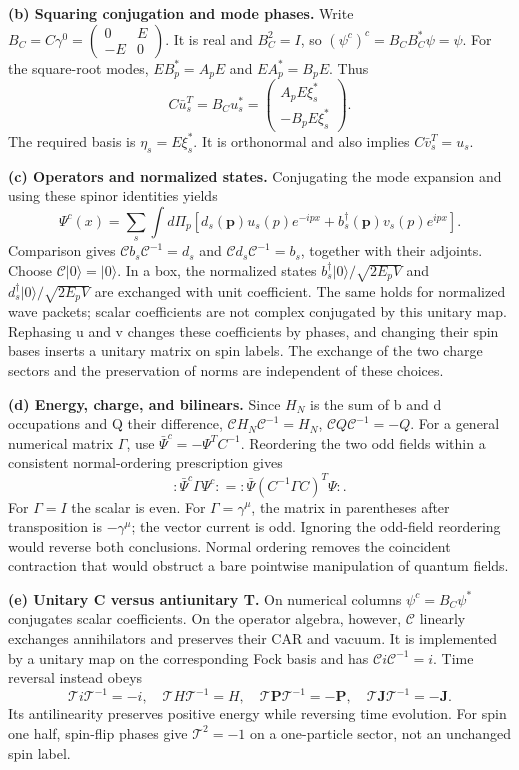 \documentclass[11pt]{article}
\newcommand{\partsol}[2]{\par\Needspace{4\baselineskip}\medskip\noindent\textbf{(#1) #2.}\quad}
\begin{document}
\partsol{b}{Squaring conjugation and mode phases}
Write \(B_C=C\gamma^0=\left(\begin{smallmatrix}0&E\\-E&0\end{smallmatrix}\right)\).
It is real and \(B_C^2=I\), so \((\psi^c)^c=B_CB_C^*\psi=\psi\).
For the square-root modes, \(EB_p^*=A_pE\) and \(EA_p^*=B_pE\). Thus
\[
 C\bar u_s^T=B_Cu_s^*
 =\begin{pmatrix}A_p E\xi_s^*\\-B_pE\xi_s^*\end{pmatrix}.
\]
The required basis is \(\eta_s=E\xi_s^*\). It is orthonormal and also
implies \(C\bar v_s^T=u_s\).

\partsol{c}{Operators and normalized states}
Conjugating the mode expansion and using these spinor identities yields
\[
 \Psi^c(x)=\sum_s\int d\Pi_p
 [d_s(\bm p)u_s(p)e^{-ipx}+b_s^\dagger(\bm p)v_s(p)e^{ipx}].
\]
Comparison gives \(\mathcal C b_s\mathcal C^{-1}=d_s\) and
\(\mathcal C d_s\mathcal C^{-1}=b_s\), together with their adjoints.
Choose \(\mathcal C|0\rangle=|0\rangle\). In a box, the normalized
states \(b_s^\dagger|0\rangle/\sqrt{2E_pV}\) and
\(d_s^\dagger|0\rangle/\sqrt{2E_pV}\) are exchanged with unit coefficient.
The same holds for normalized wave packets; scalar coefficients are
not complex conjugated by this unitary map. Rephasing u and v changes
these coefficients by phases, and changing their spin bases inserts a
unitary matrix on spin labels. The exchange of the two charge sectors
and the preservation of norms are independent of these choices.

\partsol{d}{Energy, charge, and bilinears}
Since \(H_N\) is the sum of b and d occupations and Q their difference,
\(\mathcal C H_N\mathcal C^{-1}=H_N\),
\(\mathcal C Q\mathcal C^{-1}=-Q\). For a general numerical matrix
\(\Gamma\), use \(\bar\Psi^c=-\Psi^T C^{-1}\). Reordering the two odd
fields within a consistent normal-ordering prescription gives
\[
 :\bar\Psi^c\Gamma\Psi^c:
 =:\bar\Psi(C^{-1}\Gamma C)^T\Psi:.
\]
For \(\Gamma=I\) the scalar is even. For \(\Gamma=\gamma^\mu\), the
matrix in parentheses after transposition is \(-\gamma^\mu\); the
vector current is odd. Ignoring the odd-field reordering would reverse
both conclusions. Normal ordering removes the coincident contraction
that would obstruct a bare pointwise manipulation of quantum fields.

\partsol{e}{Unitary C versus antiunitary T}
On numerical columns \(\psi^c=B_C\psi^*\) conjugates scalar coefficients.
On the operator algebra, however, \(\mathcal C\) linearly exchanges
annihilators and preserves their CAR and vacuum. It is implemented by
a unitary map on the corresponding Fock basis and has
\(\mathcal C i\mathcal C^{-1}=i\). Time reversal instead obeys
\[
 \mathcal T i\mathcal T^{-1}=-i,\quad \mathcal T H\mathcal T^{-1}=H,
 \quad \mathcal T\bm P\mathcal T^{-1}=-\bm P,
 \quad \mathcal T\bm J\mathcal T^{-1}=-\bm J.
\]
Its antilinearity preserves positive energy while reversing time evolution.
For spin one half, spin-flip phases give \(\mathcal T^2=-1\) on a
one-particle sector, not an unchanged spin label.
\end{document}
